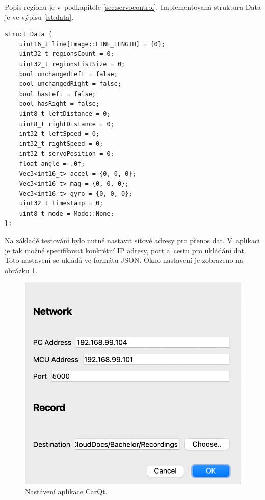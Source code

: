 Popis regionu je v~podkapitole \ref{sec:servocontrol}.
Implementovaná struktura Data je ve výpisu \ref{lst:data}.
\begin{lstlisting}[caption = Struktura Data, label = lst:data]
struct Data {
    uint16_t line[Image::LINE_LENGTH] = {0};
    uint32_t regionsCount = 0;
    uint32_t regionsListSize = 0;
    bool unchangedLeft = false;
    bool unchangedRight = false;
    bool hasLeft = false;
    bool hasRight = false;
    uint8_t leftDistance = 0;
    uint8_t rightDistance = 0;
    int32_t leftSpeed = 0;
    int32_t rightSpeed = 0;
    int32_t servoPosition = 0;
    float angle = .0f;
    Vec3<int16_t> accel = {0, 0, 0};
    Vec3<int16_t> mag = {0, 0, 0};
    Vec3<int16_t> gyro = {0, 0, 0};
    uint32_t timestamp = 0;
    uint8_t mode = Mode::None;
};
\end{lstlisting}

Na základě testování bylo nutné nastavit síťové adresy pro přenos dat. V~aplikaci je tak možné specifikovat konkrétní IP adresy, port a~cestu pro ukládání dat. Toto nastavení se ukládá ve formátu JSON. Okno nastavení je zobrazeno na obrázku \ref{fig:CarQtSettings}.
\begin{figure}[!h]
\centering
    \includegraphics[width = .5\linewidth]{Figures/SettingsWindow.png}
\caption{Nastávení aplikace CarQt.}
\label{fig:CarQtSettings}
\end{figure}

\endinput